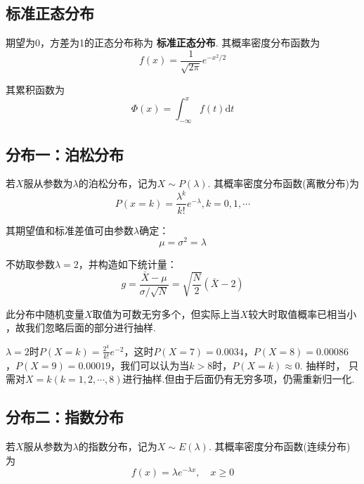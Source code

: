 \documentclass[12pt,a4paper,utf8]{ctexart}
\begin{document}
\subsection{标准正态分布}

期望为0，方差为1的正态分布称为 \textbf{标准正态分布}. 其概率密度分布函数为
\begin{equation}
    f(x) = \frac{1}{\sqrt{2\pi}}e^{-x^2/2}
\end{equation}

其累积函数为
\begin{equation}
    \Phi(x) = \int _{-\infty} ^{x} f(t) \textrm{d}t 	
\end{equation}
\subsection{分布一：泊松分布}

若$X$服从参数为$\lambda$的泊松分布，记为$X \sim P(\lambda)$.
其概率密度分布函数(离散分布)为
\begin{equation}
    P(x = k) = \frac{\lambda^k}{k!}e^{-\lambda}, k = 0, 1,\cdots
\end{equation}

其期望值和标准差值可由参数$\lambda$确定：
\begin{equation}
    \mu = \sigma^2 = \lambda
\end{equation}

不妨取参数$\lambda = 2$，并构造如下统计量：
\begin{equation}
    g = \frac{ \bar{X} - \mu}{\sigma/\sqrt{N}} 
    = \sqrt{ \frac{N}{2}}(\bar{X} - 2)
\end{equation}

此分布中随机变量$X$取值为可数无穷多个，但实际上当$X$较大时取值概率已相当小
，故我们忽略后面的部分进行抽样.

$\lambda=2$时$P(X=k) =
\frac{2^k}{k!}e^{-2}$，这时$P(X=7)=0.0034$，$P(X=8)=0.00086$
，$P(X=9)=0.00019$，我们可以认为当$k > 8$时，$P(X=k) \approx 0$. 抽样时，
只需对$X=k(k=1,2,\cdots,8)$进行抽样.但由于后面仍有无穷多项，仍需重新归一化.
\subsection{分布二：指数分布}

若$X$服从参数为$\lambda$的指数分布，记为$X \sim E(\lambda)$.
其概率密度分布函数(连续分布)为
\begin{equation}
    f(x) = \lambda e^{-\lambda x}, \quad x \geq 0
\end{equation}
\end{document}
